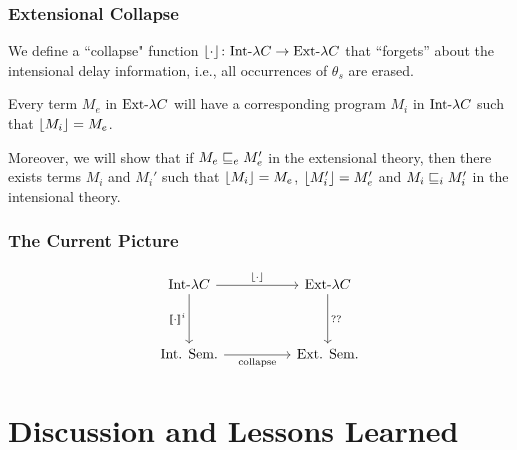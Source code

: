 \documentclass[
	11pt, %
]{beamer}
\begin{document}
\begin{frame}
	\frametitle{Extensional Collapse}

	We define a ``collapse" function $\lfloor {\cdot} \rfloor \colon \text{Int-}\lambda C \to \text{Ext-}\lambda C$
	that ``forgets'' about the intensional delay information, i.e., all occurrences of $\theta_s$ are erased.

	\medskip
	
	Every term $M_e$ in $\text{Ext-}\lambda C$ will have a corresponding program $M_i$ in $\text{Int-}\lambda C$ such that $\lfloor {M_i} \rfloor = M_e$.

	\medskip
	
	Moreover, we will show that if $M_e \sqsubseteq_e M_e'$ in the extensional theory,
	then there exists terms $M_i$ and $M_i'$ such that $\lfloor {M_i} \rfloor=M_e$, $\lfloor {M_i'} \rfloor=M_e'$ and
	$M_i \sqsubseteq_i M_i'$ in the intensional theory.
	

\end{frame}

\begin{frame}
	\frametitle{The Current Picture}

\[\begin{tikzcd}[ampersand replacement=\&]
	\intlc \&\& \extlc \\
	\\
	{\text{Int. Sem.}} \&\& {\text{Ext. Sem.}}
	\arrow["{\erase{\cdot}}", from=1-1, to=1-3]
	\arrow["{\sem{\cdot}^i}"', from=1-1, to=3-1]
	\arrow["{\text{collapse}}"', from=3-1, to=3-3]
	\arrow["{??}", from=1-3, to=3-3]
\end{tikzcd}\]


\end{frame}


	



	


\section{Discussion and Lessons Learned}
\frame{\tableofcontents[currentsection]}
\end{document}
